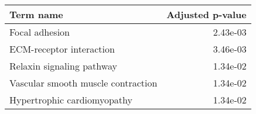 \begin{tabular}{lr}
\toprule
                         Term name &  Adjusted p-value \\
\midrule
                    Focal adhesion &          2.43e-03 \\
          ECM-receptor interaction &          3.46e-03 \\
         Relaxin signaling pathway &          1.34e-02 \\
Vascular smooth muscle contraction &          1.34e-02 \\
       Hypertrophic cardiomyopathy &          1.34e-02 \\
\bottomrule
\end{tabular}
